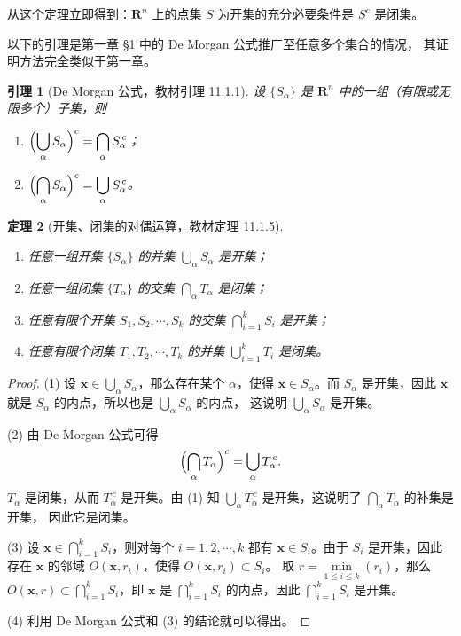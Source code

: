 \documentclass[11pt]{ctexart}
\theoremstyle{plain}
\newtheorem{thm}{定理}[section]
\newtheorem{lem}[thm]{引理}
\theoremstyle{definition}
\theoremstyle{remark}
\begin{document}
从这个定理立即得到：\(\mathbf{R}^n\) 上的点集 \(S\) 为开集的充分必要条件是
\(S^c\) 是闭集。

以下的引理是第一章 \S 1 中的 De Morgan 公式推广至任意多个集合的情况，
其证明方法完全类似于第一章。

\begin{lem}[De Morgan 公式，教材引理 11.1.1]\label{lem:demorgan}
设 \(\{S_\alpha\}\) 是 \(\mathbf{R}^n\) 中的一组（有限或无限多个）子集，则
\begin{enumerate}
  \item \(\displaystyle\Bigl(\bigcup_\alpha S_\alpha\Bigr)^c=\bigcap_\alpha S_\alpha^{\,c}\)；
  \item \(\displaystyle\Bigl(\bigcap_\alpha S_\alpha\Bigr)^c=\bigcup_\alpha S_\alpha^{\,c}\)。
\end{enumerate}
\end{lem}

\begin{thm}[开集、闭集的对偶运算，教材定理 11.1.5]\label{thm:unioninter}
\begin{enumerate}
  \item 任意一组开集 \(\{S_\alpha\}\) 的并集 \(\bigcup_\alpha S_\alpha\) 是开集；
  \item 任意一组闭集 \(\{T_\alpha\}\) 的交集 \(\bigcap_\alpha T_\alpha\) 是闭集；
  \item 任意有限个开集 \(S_1,S_2,\cdots,S_k\) 的交集
        \(\bigcap_{i=1}^{k}S_i\) 是开集；
  \item 任意有限个闭集 \(T_1,T_2,\cdots,T_k\) 的并集
        \(\bigcup_{i=1}^{k}T_i\) 是闭集。
\end{enumerate}
\end{thm}

\begin{proof}
(1) 设 \(\boldsymbol{x}\in\bigcup_\alpha S_\alpha\)，那么存在某个 \(\alpha\)，使得
\(\boldsymbol{x}\in S_\alpha\)。而 \(S_\alpha\) 是开集，因此 \(\boldsymbol{x}\) 就是
\(S_\alpha\) 的内点，所以也是 \(\bigcup_\alpha S_\alpha\) 的内点，
这说明 \(\bigcup_\alpha S_\alpha\) 是开集。

(2) 由 De Morgan 公式可得
\[
  \Bigl(\bigcap_\alpha T_\alpha\Bigr)^c=\bigcup_\alpha T_\alpha^{\,c}.
\]
\(T_\alpha\) 是闭集，从而 \(T_\alpha^{\,c}\) 是开集。由 (1) 知
\(\bigcup_\alpha T_\alpha^{\,c}\) 是开集，这说明了 \(\bigcap_\alpha T_\alpha\) 的补集是开集，
因此它是闭集。

(3) 设 \(\boldsymbol{x}\in\bigcap_{i=1}^{k}S_i\)，则对每个 \(i=1,2,\cdots,k\) 都有
\(\boldsymbol{x}\in S_i\)。由于 \(S_i\) 是开集，因此存在 \(\boldsymbol{x}\) 的邻域
\(O(\boldsymbol{x},r_i)\)，使得 \(O(\boldsymbol{x},r_i)\subset S_i\)。
取 \(r=\min\limits_{1\le i\le k}(r_i)\)，那么
\(O(\boldsymbol{x},r)\subset\bigcap_{i=1}^{k}S_i\)，即 \(\boldsymbol{x}\) 是
\(\bigcap_{i=1}^{k}S_i\) 的内点，因此 \(\bigcap_{i=1}^{k}S_i\) 是开集。

(4) 利用 De Morgan 公式和 (3) 的结论就可以得出。
\end{proof}
\end{document}
